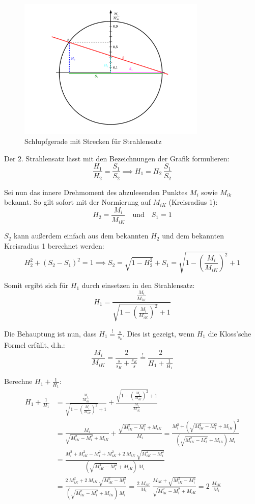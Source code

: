 \documentclass[a4paper, 11pt]{article}
\begin{document}
\begin{figure}[H]
	\centering
	\includegraphics[width=0.8\textwidth]{img/asynchronmaschine_schlupfgerade.pdf}
	\caption*{Schlupfgerade mit Strecken für Strahlensatz}
\end{figure}

Der 2. Strahlensatz lässt mit den Bezeichnungen der Grafik formulieren:
\[
	\frac{H_1}{H_2} = \frac{S_1}{S_2} \implies H_1 = H_2 ~ \frac{S_1}{S_2}
\]

Sei nun das innere Drehmoment des abzulesenden Punktes $M_i$ sowie $M_{ik}$ bekannt. So gilt sofort mit der Normierung auf $M_{iK}$ (Kreisradius 1):
\[
	H_2 = \frac{M_i}{M_{iK}} \quad \mathrm{und} \quad S_1 = 1
\]

$S_2$ kann außerdem einfach aus dem bekannten $H_2$ und dem bekannten Kreisradius 1 berechnet werden:
\[
	H_2^2 + (S_2 - S_1)^2 = 1 \implies S_2 = \sqrt{1 - H_2^2} + S_1 = \sqrt{1 - \left( \frac{M_i}{M_{iK}} \right)^2} + 1
\]

Somit ergibt sich für $H_1$ durch einsetzen in den Strahlensatz:
\[
	H_1 = \frac{\frac{M_i}{M_{iK}}}{\sqrt{1 - \left( \frac{M_i}{M_{iK}} \right)^2} + 1}
\]

Die Behauptung ist nun, dass $H_1 \overset{!}{=} \frac{s}{s_k}$. Dies ist gezeigt, wenn $H_1$ die Kloss'sche Formel erfüllt, d.h.:
\[
	\frac{M_i}{M_{iK}} = \frac{2}{\frac{s}{s_K} + \frac{s_K}{s}} \overset{!}{=} \frac{2}{H_1 + \frac{1}{H_1}}
\]

Berechne $H_1 + \frac{1}{H_1}$:
\begin{align*}
H_1 + \frac{1}{H_1}
		&= \frac{\frac{M_i}{M_{iK}}}{\sqrt{1 - \left( \frac{M_i}{M_{iK}} \right)^2} + 1} + \frac{\sqrt{1 - \left( \frac{M_i}{M_{iK}} \right)^2} + 1}{\frac{M_i}{M_{iK}}} \\
		&= \frac{M_i}{\sqrt{M_{iK}^2 - M_i^2} + M_{iK}} + \frac{\sqrt{M_{iK}^2 - M_i^2} + M_{iK}}{M_i} = \frac{M_i^2 + \left(\sqrt{M_{iK}^2 - M_i^2} + M_{iK}\right)^2}{\left(\sqrt{M_{iK}^2 - M_i^2} + M_{iK}\right)~M_i} \\
		&= \frac{M_i^2 + M_{iK}^2 - M_i^2 + M_{iK}^2 + 2 ~ M_{iK} ~ \sqrt{M_{iK}^2 - M_i^2}}{\left(\sqrt{M_{iK}^2 - M_i^2} + M_{iK}\right)~M_i} \\
		&= \frac{2 ~ M_{iK}^2 + 2 ~ M_{iK} ~ \sqrt{M_{iK}^2 - M_i^2}}{\left(\sqrt{M_{iK}^2 - M_i^2} + M_{iK}\right)~M_i} = \frac{2 \; M_{iK}}{M_i} ~ \frac{M_{iK} + \sqrt{M_{iK}^2 - M_i^2}}{\sqrt{M_{iK}^2 - M_i^2} + M_{iK}} = 2 ~ \frac{M_{iK}}{M_i}
\end{align*}
\end{document}
